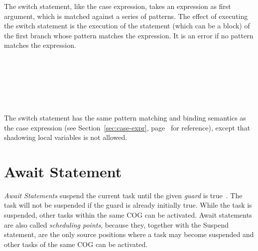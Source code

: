 The switch statement, like the case expression, takes an expression as
first argument, which is matched against a series of patterns.  The
effect of executing the switch statement is the execution of the statement
(which can be a block) of the first branch whose pattern matches the
expression.  It is an error if no pattern matches the expression.


\begin{abssyntax}
        {}\ \ \TRS{\{} \ \TRS{\}}\\
     {}\ \TRS{=>}\ \ \TRS{;}\\
        {}
                  {}
                  {}
                  \TRS{\_}\\
  {}\ \\
    {}\ 
\end{abssyntax}

The switch statement has the same pattern matching and binding semantics
as the case expression (see Section~\ref{sec:case-expr},
page~\pageref{sec:case-expr} for reference), except that shadowing local
variables is not allowed.


\section{Await Statement}
\emph{Await Statements} suspend the current task until the given
\emph{guard} is true~\cite{johnsen10fmco}. The task will not be
suspended if the guard is already initially true.  While the task is
suspended, other tasks within the same COG can be activated.  Await
statements are also called \emph{scheduling points}, because they, together with the Suspend statement, are
the only source positions where a task may become suspended and other
tasks of the same COG can be activated.


\begin{abssyntax}
   {}\ \ \TRS{;}\\
       {}
               {}
               {}\ \TRS{\&}\ \\
  {}\ 
               {}\ 
\end{abssyntax}

